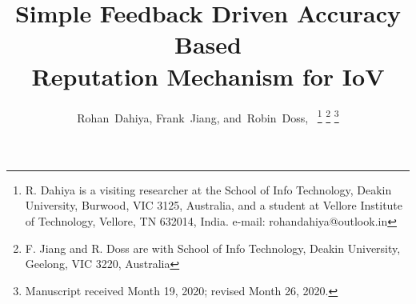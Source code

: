 \documentclass[journal]{IEEEtran}
\begin{document}
%
\title{Simple Feedback Driven Accuracy Based\\ Reputation Mechanism for IoV}
%
%
%
\author{Rohan~Dahiya,
        Frank~Jiang,
        and~Robin~Doss,~%
\thanks{R. Dahiya is a visiting researcher at the School of Info Technology, Deakin University, Burwood, VIC 3125, Australia, and a student at Vellore Institute of Technology, Vellore, TN 632014, India. e-mail: rohandahiya@outlook.in}%
\thanks{F. Jiang and R. Doss are with School of Info Technology, Deakin University, Geelong, VIC 3220, Australia}%
\thanks{Manuscript received Month 19, 2020; revised Month 26, 2020.}}

% 
%
\end{document}
